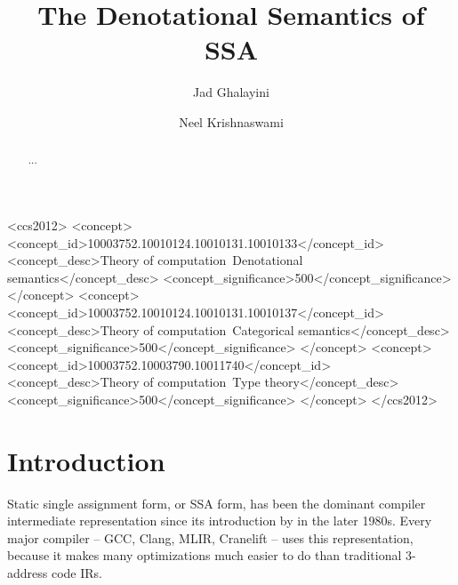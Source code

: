 \documentclass[acmsmall,screen,review]{acmart}
\begin{document}
\title{The Denotational Semantics of SSA}

\author{Jad Ghalayini}

\author{Neel Krishnaswami}

\begin{abstract}
  ...
\end{abstract}

\begin{CCSXML}
  <ccs2012>
  <concept>
  <concept_id>10003752.10010124.10010131.10010133</concept_id>
  <concept_desc>Theory of computation~Denotational semantics</concept_desc>
  <concept_significance>500</concept_significance>
  </concept>
  <concept>
  <concept_id>10003752.10010124.10010131.10010137</concept_id>
  <concept_desc>Theory of computation~Categorical semantics</concept_desc>
  <concept_significance>500</concept_significance>
  </concept>
  <concept>
  <concept_id>10003752.10003790.10011740</concept_id>
  <concept_desc>Theory of computation~Type theory</concept_desc>
  <concept_significance>500</concept_significance>
  </concept>
  </ccs2012>
\end{CCSXML}




\maketitle

\section{Introduction}

Static single assignment form, or SSA form, has been the dominant
compiler intermediate representation since its introduction by
\citet{cytron-ssa-intro-91} in the later 1980s. Every major compiler -- GCC, Clang,
MLIR, Cranelift -- uses this representation, because it makes many
optimizations much easier to do than traditional 3-address code IRs.
\end{document}
